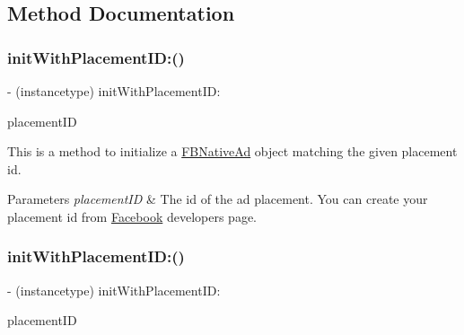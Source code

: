 \subsection{Method Documentation}
\mbox{\label{interfaceFBNativeAd_af90f836b1fae6e994657a1d1d3724922}} 
\subsubsection{\texorpdfstring{init\+With\+Placement\+I\+D\+:()}{initWithPlacementID:()}\hspace{0.1cm}{\footnotesize\ttfamily [1/5]}}
{\footnotesize\ttfamily -\/ (instancetype) init\+With\+Placement\+I\+D\+: \begin{DoxyParamCaption}\item[{(N\+S\+String $\ast$)}]{placement\+ID }\end{DoxyParamCaption}}

This is a method to initialize a \hyperlink{interfaceFBNativeAd}{F\+B\+Native\+Ad} object matching the given placement id.


\begin{DoxyParams}{Parameters}
{\em placement\+ID} & The id of the ad placement. You can create your placement id from \hyperlink{interfaceFacebook}{Facebook} developers page. \\
\hline
\end{DoxyParams}
\mbox{\label{interfaceFBNativeAd_af90f836b1fae6e994657a1d1d3724922}} 
\subsubsection{\texorpdfstring{init\+With\+Placement\+I\+D\+:()}{initWithPlacementID:()}\hspace{0.1cm}{\footnotesize\ttfamily [2/5]}}
{\footnotesize\ttfamily -\/ (instancetype) init\+With\+Placement\+I\+D\+: \begin{DoxyParamCaption}\item[{(N\+S\+String $\ast$)}]{placement\+ID }\end{DoxyParamCaption}}


